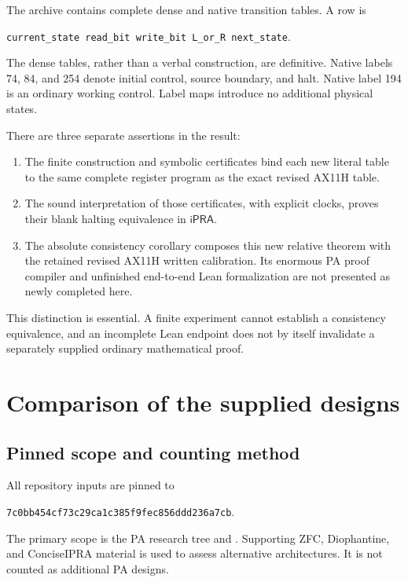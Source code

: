 \documentclass[11pt,a4paper]{article}
\newcommand{\ipra}{\mathsf{iPRA}}
\newcommand{\hash}[1]{\nolinkurl{#1}}
\begin{document}


The archive contains complete dense and native transition tables. A row is
\begin{center}
\texttt{current\_state read\_bit write\_bit L\_or\_R next\_state}.
\end{center}
The dense tables, rather than a verbal construction, are definitive. Native
labels 74, 84, and 254 denote initial control, source boundary, and halt.
Native label 194 is an ordinary working control. Label maps introduce no
additional physical states.

There are three separate assertions in the result:
\begin{enumerate}
\item The finite construction and symbolic certificates bind each new
literal table to the same complete register program as the exact revised
AX11H table.
\item The sound interpretation of those certificates, with explicit clocks,
proves their blank halting equivalence in $\ipra$.
\item The absolute consistency corollary composes this new relative theorem
with the retained revised AX11H written calibration. Its enormous PA proof
compiler and unfinished end-to-end Lean formalization are not presented as
newly completed here.
\end{enumerate}
This distinction is essential. A finite experiment cannot establish a
consistency equivalence, and an incomplete Lean endpoint does not by itself
invalidate a separately supplied ordinary mathematical proof.

\section{Comparison of the supplied designs}
\label{sec:comparison}

\subsection{Pinned scope and counting method}
All repository inputs are pinned to
\begin{center}\small
\hash{7c0bb454cf73c29ca1c385f9fec856ddd236a7cb}.
\end{center}
The primary scope is the PA research tree and .
Supporting ZFC, Diophantine, and ConciseIPRA material is used to assess
alternative architectures. It is not counted as additional PA designs.
\end{document}
